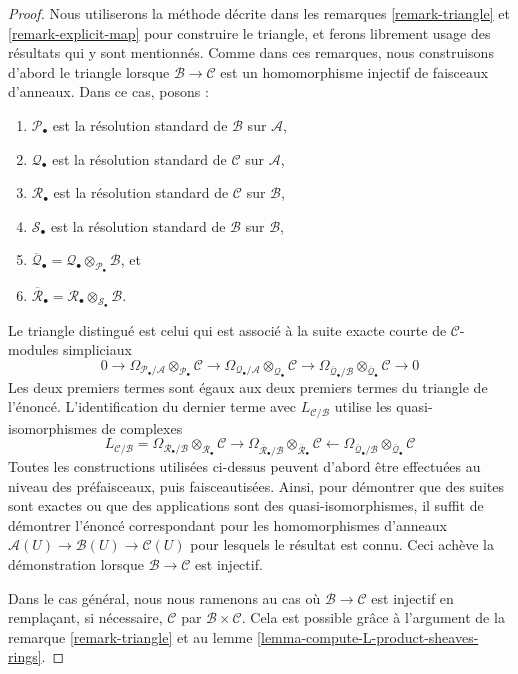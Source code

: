 \begin{proof}
Nous utiliserons la méthode décrite dans les remarques \ref{remark-triangle} et
\ref{remark-explicit-map} pour construire le triangle, et ferons librement
usage des résultats qui y sont mentionnés. Comme dans ces remarques, nous
construisons d'abord le triangle lorsque
$\mathcal{B} \to \mathcal{C}$ est un homomorphisme injectif de faisceaux
d'anneaux. Dans ce cas, posons :
\begin{enumerate}
\item $\mathcal{P}_\bullet$ est la résolution standard de $\mathcal{B}$ sur
$\mathcal{A}$,
\item $\mathcal{Q}_\bullet$ est la résolution standard de $\mathcal{C}$ sur
$\mathcal{A}$,
\item $\mathcal{R}_\bullet$ est la résolution standard de $\mathcal{C}$ sur
$\mathcal{B}$,
\item $\mathcal{S}_\bullet$ est la résolution standard de $\mathcal{B}$ sur
$\mathcal{B}$,
\item $\overline{\mathcal{Q}}_\bullet =
\mathcal{Q}_\bullet \otimes_{\mathcal{P}_\bullet} \mathcal{B}$, et
\item $\overline{\mathcal{R}}_\bullet =
\mathcal{R}_\bullet \otimes_{\mathcal{S}_\bullet} \mathcal{B}$.
\end{enumerate}
Le triangle distingué est celui qui est associé à la suite exacte courte de
$\mathcal{C}$-modules simpliciaux
$$
0 \to
\Omega_{\mathcal{P}_\bullet/\mathcal{A}}
\otimes_{\mathcal{P}_\bullet} \mathcal{C} \to
\Omega_{\mathcal{Q}_\bullet/\mathcal{A}}
\otimes_{\mathcal{Q}_\bullet} \mathcal{C} \to
\Omega_{\overline{\mathcal{Q}}_\bullet/\mathcal{B}}
\otimes_{\overline{\mathcal{Q}}_\bullet} \mathcal{C} \to 0
$$
Les deux premiers termes sont égaux aux deux premiers termes du triangle de
l'énoncé. L'identification du dernier terme avec
$L_{\mathcal{C}/\mathcal{B}}$ utilise les quasi-isomorphismes de complexes
$$
L_{\mathcal{C}/\mathcal{B}} =
\Omega_{\mathcal{R}_\bullet/\mathcal{B}}
\otimes_{\mathcal{R}_\bullet} \mathcal{C}
\longrightarrow
\Omega_{\overline{\mathcal{R}}_\bullet/\mathcal{B}}
\otimes_{\overline{\mathcal{R}}_\bullet} \mathcal{C}
\longleftarrow
\Omega_{\overline{\mathcal{Q}}_\bullet/\mathcal{B}}
\otimes_{\overline{\mathcal{Q}}_\bullet} \mathcal{C}
$$
Toutes les constructions utilisées ci-dessus peuvent d'abord être effectuées
au niveau des préfaisceaux, puis faisceautisées. Ainsi, pour démontrer que des
suites sont exactes ou que des applications sont des quasi-isomorphismes, il
suffit de démontrer l'énoncé correspondant pour les homomorphismes d'anneaux
$\mathcal{A}(U) \to \mathcal{B}(U) \to \mathcal{C}(U)$
pour lesquels le résultat est connu. Ceci achève la démonstration lorsque
$\mathcal{B} \to \mathcal{C}$ est injectif.

\medskip\noindent
Dans le cas général, nous nous ramenons au cas où
$\mathcal{B} \to \mathcal{C}$ est injectif en remplaçant, si nécessaire,
$\mathcal{C}$ par $\mathcal{B} \times \mathcal{C}$. Cela est possible grâce à
l'argument de la remarque \ref{remark-triangle} et au lemme
\ref{lemma-compute-L-product-sheaves-rings}.
\end{proof}

